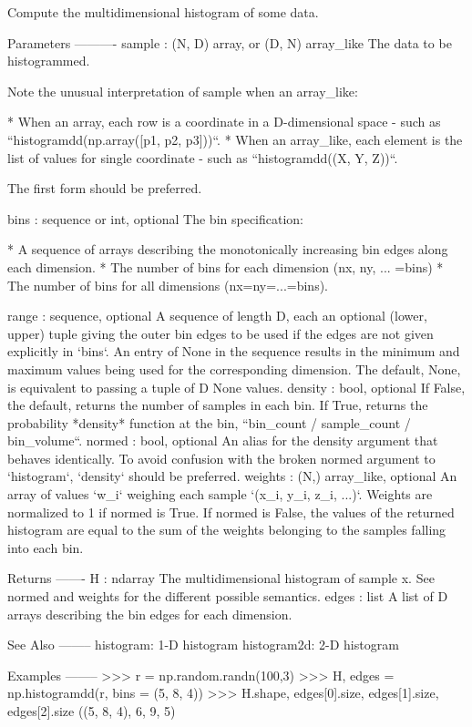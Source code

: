 \begin{DoxyVerb}Compute the multidimensional histogram of some data.

Parameters
----------
sample : (N, D) array, or (D, N) array_like
    The data to be histogrammed.

    Note the unusual interpretation of sample when an array_like:

    * When an array, each row is a coordinate in a D-dimensional space -
      such as ``histogramdd(np.array([p1, p2, p3]))``.
    * When an array_like, each element is the list of values for single
      coordinate - such as ``histogramdd((X, Y, Z))``.

    The first form should be preferred.

bins : sequence or int, optional
    The bin specification:

    * A sequence of arrays describing the monotonically increasing bin
      edges along each dimension.
    * The number of bins for each dimension (nx, ny, ... =bins)
    * The number of bins for all dimensions (nx=ny=...=bins).

range : sequence, optional
    A sequence of length D, each an optional (lower, upper) tuple giving
    the outer bin edges to be used if the edges are not given explicitly in
    `bins`.
    An entry of None in the sequence results in the minimum and maximum
    values being used for the corresponding dimension.
    The default, None, is equivalent to passing a tuple of D None values.
density : bool, optional
    If False, the default, returns the number of samples in each bin.
    If True, returns the probability *density* function at the bin,
    ``bin_count / sample_count / bin_volume``.
normed : bool, optional
    An alias for the density argument that behaves identically. To avoid
    confusion with the broken normed argument to `histogram`, `density`
    should be preferred.
weights : (N,) array_like, optional
    An array of values `w_i` weighing each sample `(x_i, y_i, z_i, ...)`.
    Weights are normalized to 1 if normed is True. If normed is False,
    the values of the returned histogram are equal to the sum of the
    weights belonging to the samples falling into each bin.

Returns
-------
H : ndarray
    The multidimensional histogram of sample x. See normed and weights
    for the different possible semantics.
edges : list
    A list of D arrays describing the bin edges for each dimension.

See Also
--------
histogram: 1-D histogram
histogram2d: 2-D histogram

Examples
--------
>>> r = np.random.randn(100,3)
>>> H, edges = np.histogramdd(r, bins = (5, 8, 4))
>>> H.shape, edges[0].size, edges[1].size, edges[2].size
((5, 8, 4), 6, 9, 5)\end{DoxyVerb}
 

